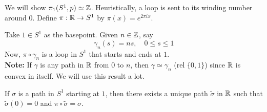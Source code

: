 
We will show $\pi_1(S^1, p) \simeq \mathbb{Z}$. Heuristically, a loop is sent to its winding number around $0$. Define $\pi : \mathbb{R} \to S^1$ by $\pi(x) = e^{2\pi i x}$.

Take $1 \in S^1$ as the basepoint. Given $n \in \mathbb{Z}$, say
\[ \gamma_n(s) = ns, \quad 0 \leq s \leq 1 \]
Now, $\pi \circ \gamma_n$ is a loop in $S^1$ that starts and ends at $1$.\\

\textbf{Note:} If $\gamma$ is any path in $\mathbb{R}$ from $0$ to $n$, then $\gamma \simeq \gamma_n$ (rel $\{0, 1\}$) since $\mathbb{R}$ is convex in itself. We will use this result a lot.

\begin{lemma}
    If $\sigma$ is a path in $S^1$ starting at $1$, then there exists a unique path $\tilde{\sigma}$ in $\mathbb{R}$ such that $\tilde{\sigma}(0) = 0$ and $\pi \circ \tilde{\sigma} = \sigma$.
\end{lemma}
